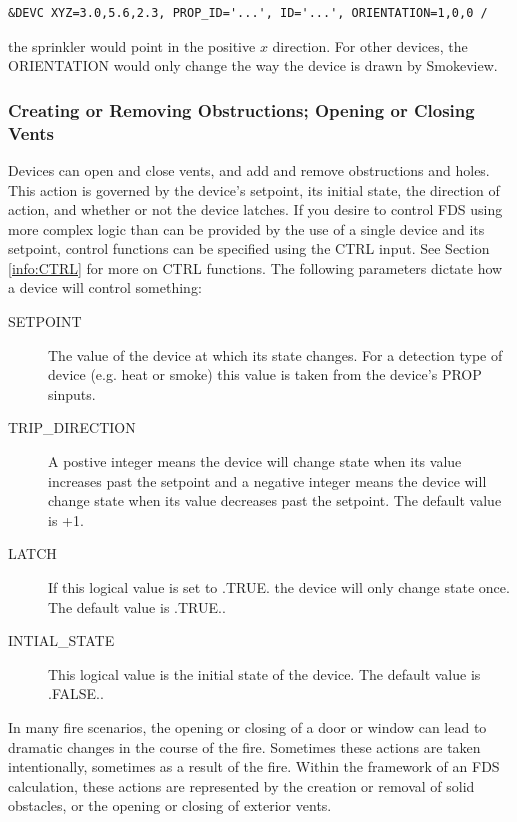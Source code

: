 \documentclass[11pt]{book}
\begin{document}
\footnotesize
\begin{verbatim}
&DEVC XYZ=3.0,5.6,2.3, PROP_ID='...', ID='...', ORIENTATION=1,0,0 /
\end{verbatim}
\normalsize

\noindent
the sprinkler would point in the positive $x$ direction.
For other devices, the {\ct ORIENTATION} would only change the way the device is drawn by Smokeview.



\subsubsection{Creating or Removing Obstructions; Opening or Closing Vents}
\label{info:openclose}

Devices can open and close vents, and add and remove obstructions and holes.
This action is governed by the device's setpoint, its initial state, the direction of action, and whether
or not the device latches.  If you desire to control FDS using more complex logic than can be provided
by the use of a single device and its setpoint, control functions can be specified using the {\ct CTRL} input.
See Section \ref{info:CTRL} for more on CTRL functions.
The following parameters dictate how a device will control something:

\begin{description}
\item[{\ct SETPOINT}] The value of the device at which its state changes.  For a detection type of device
(e.g. heat or smoke) this value is taken from the device's {\ct PROP} sinputs.
\item[{\ct TRIP\_DIRECTION}] A postive integer means the device will change state when its value increases
past the setpoint and a negative integer means the device will change state
when its value decreases past the setpoint.  The default value is +1.
\item[{\ct LATCH}] If this logical value is set to {\ct .TRUE.} the device will only change state once.
The default value is {\ct .TRUE.}.
\item[{\ct INTIAL\_STATE}] This logical value is the initial state of the device. The default value
is {\ct .FALSE.}.
\end{description}

In many fire scenarios, the opening or closing of a door or window
can lead to dramatic changes in the course of the fire. Sometimes these
actions are taken intentionally, sometimes as a result of the fire.
Within the framework of an FDS calculation, these actions are
represented by the creation or removal of solid obstacles, or the
opening or closing of exterior vents.
\end{document}
